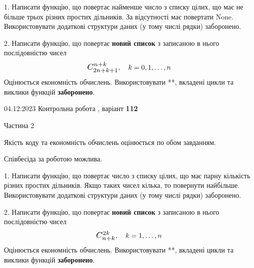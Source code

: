 \documentclass[12pt, ukrainian]{article}
\begin{document}
{{{{{{{{{{{\begin {Large}
\vspace{5mm}

1. Написати функцію, що повертає найменше число з списку цілих, що має не більше трьох різних простих дільників. За відсутності має повертати None. Використовувати додаткові структури даних (у тому числі рядки) заборонено.

\vspace{10mm}



2. 
Написати функцію, що повертає \textbf{новий список} з записаною в нього послідовністю чисел
$$\scalebox{1.2}{$C_{2n+k+1}^{n+k}$}, \quad k=0,1,\ldots,n$$
Оцінюється економність обчислень. Використовувати **, вкладені цикли та виклики функцій \textbf{заборонено}.

\end{Large}\newpage




\begin {Huge}
{{04.12.2023 Контрольна робота , варіант  \No \textbf { 112 }\par}}

\begin{center}Частина 2
\end{center}
\vspace{10mm}
\end {Huge}

{
\begin {Large}
Якість коду та економність обчислень оцінюється по обом завданням.

Співбесіда за роботою можлива.

\vspace{5mm}

1. Написати функцію, що повертає число з списку цілих, що має парну кількість різних простих дільників. Якщо таких чисел кілька, то повернути найбільше. Використовувати додаткові структури даних (у тому числі рядки) заборонено.

\vspace{10mm}



2. 
Написати функцію, що повертає \textbf{новий список} з записаною в нього послідовністю чисел
$$\scalebox{1.2}{$C_{n+k}^{2k}$}, \quad k=1,\ldots,n$$
Оцінюється економність обчислень. Використовувати **, вкладені цикли та виклики функцій \textbf{заборонено}.

\end{Large}\newpage

}}}}}}}}}}}}
\end{document}
